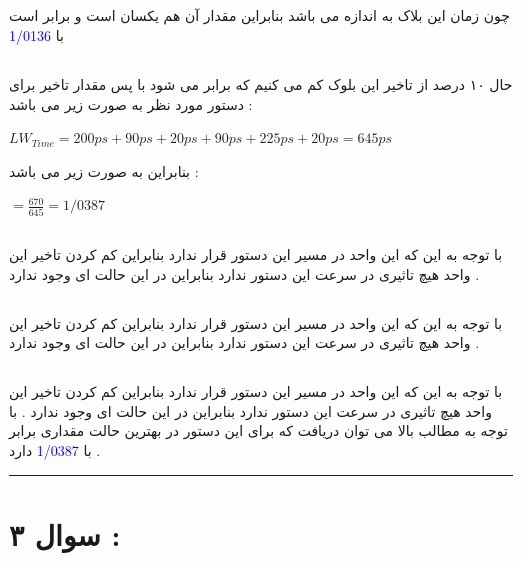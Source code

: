 \subsection*{}
چون زمان این بلاک به اندازه 
می باشد بنابراین مقدار 
آن هم یکسان است و برابر است با 
\textcolor{blue}{1/0136}

\subsection*{}
حال ۱۰ درصد از تاخیر این بلوک کم می کنیم که برابر می شود با  
\textcolor{red}{}
پس مقدار تاخیر برای دستور مورد نظر به صورت زیر می باشد  :
\begin{center}
	$LW _{Time} = 200ps + 90ps + 20ps + 90ps + 225ps + 20ps = 645ps$
\end{center}
بنابراین 
به صورت زیر می باشد  : 
\begin{center}
	
	$ = \frac{670}{645} = 1/0387 $	
\end{center}
\subsection*{}
با توجه به این که این واحد در مسیر این دستور قرار ندارد بنابراین کم کردن تاخیر این واحد  هیچ تاثیری در سرعت این دستور ندارد بنابراین در این حالت 
ای وجود ندارد . 
\subsection*{}
با توجه به این که این واحد در مسیر این دستور قرار ندارد بنابراین کم کردن تاخیر این واحد  هیچ تاثیری در سرعت این دستور ندارد بنابراین در این حالت 
ای وجود ندارد . 
\subsection*{}
با توجه به این که این واحد در مسیر این دستور قرار ندارد بنابراین کم کردن تاخیر این واحد  هیچ تاثیری در سرعت این دستور ندارد بنابراین در این حالت 
ای وجود ندارد . 
\newline
\newline
با توجه به مطالب بالا می توان دریافت که
برای این دستور در بهترین حالت مقداری برابر با 
\textcolor{blue}{1/0387}
دارد . 
\hrule
\section*{سوال ۳ : }
